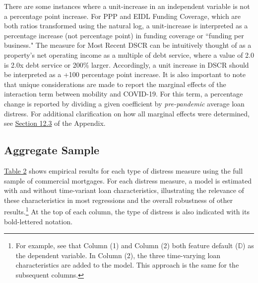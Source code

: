 \documentclass[11pt]{article} %
\begin{document}
There are some instances where a unit-increase in an independent variable is not a percentage point increase. For PPP and EIDL Funding Coverage, which are both ratios transformed using the natural log, a unit-increase is interpreted as a percentage increase (not percentage point) in funding coverage or ``funding per business." The measure for Most Recent DSCR can be intuitively thought of as a property's net operating income as a multiple of debt service, where a value of 2.0 is 2.0x debt service or 200\% larger. Accordingly, a unit increase in DSCR should be interpreted as a +100 percentage point increase. It is also important to note that unique considerations are made to report the marginal effects of the interaction term between mobility and COVID-19. For this term, a percentage change is reported by dividing a given coefficient by \textit{pre-pandemic} average loan distress. For additional clarification on how all marginal effects were determined, see \hyperlink{Marginal Effects}{Section 12.3} of the Appendix. 

\subsection{Aggregate Sample}
\hyperlink{Regression 1}{Table 2} shows empirical results for each type of distress measure using the full sample of commercial mortgages. For each distress measure, a model is estimated with and without time-variant loan characteristics, illustrating the relevance of these characteristics in most regressions and the overall robustness of other results.\footnote{For example, see that Column (1) and Column (2) both feature default ($\mathbb{D}$) as the dependent variable. In Column (2), the three time-varying loan characteristics are added to the model. This approach is the same for the subsequent columns.} At the top of each column, the type of distress is also indicated with its bold-lettered notation.
\end{document}
